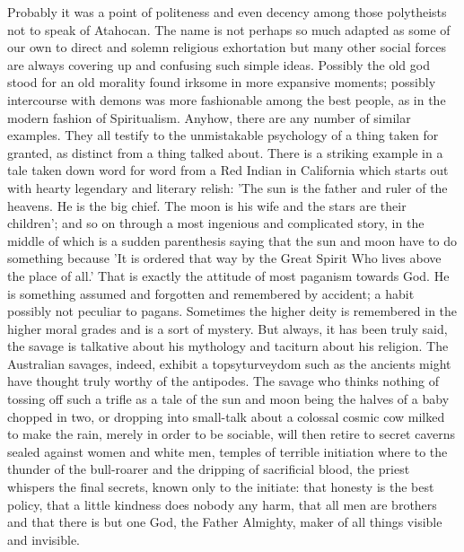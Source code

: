 Probably it was a point of politeness and even decency among those polytheists not to speak of Atahocan. The name is not perhaps so much adapted as some of our own to direct and solemn religious exhortation but many other social forces are always covering up and confusing such simple ideas. Possibly the old god stood for an old morality found irksome in more expansive moments; possibly intercourse with demons was more fashionable among the best people, as in the modern fashion of Spiritualism. Anyhow, there are any number of similar examples. They all testify to the unmistakable psychology of a thing taken for granted, as distinct from a thing talked about. There is a striking example in a tale taken down word for word from a Red Indian in California which starts out with hearty legendary and literary relish: 'The sun is the father and ruler of the heavens. He is the big chief. The moon is his wife and the stars are their children'; and so on through a most ingenious and complicated story, in the middle of which is a sudden parenthesis saying that the sun and moon have to do something because 'It is ordered that way by the Great Spirit Who lives above the place of all.' That is exactly the attitude of most paganism towards God. He is something assumed and forgotten and remembered by accident; a habit possibly not peculiar to pagans. Sometimes the higher deity is remembered in the higher moral grades and is a sort of mystery. But always, it has been truly said, the savage is talkative about his mythology and taciturn about his religion. The Australian savages, indeed, exhibit a topsyturveydom such as the ancients might have thought truly worthy of the antipodes. The savage who thinks nothing of tossing off such a trifle as a tale of the sun and moon being the halves of a baby chopped in two, or dropping into small-talk about a colossal cosmic cow milked to make the rain, merely in order to be sociable, will then retire to secret caverns sealed against women and white men, temples of terrible initiation where to the thunder of the bull-roarer and the dripping of sacrificial blood, the priest whispers the final secrets, known only to the initiate: that honesty is the best policy, that a little kindness does nobody any harm, that all men are brothers and that there is but one God, the Father Almighty, maker of all things visible and invisible.

